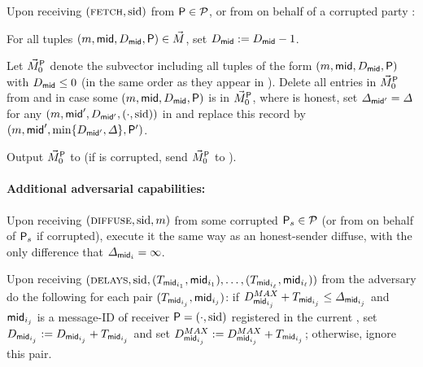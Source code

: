 \begin{cccFunctionality}
\begin{cccItemize}[nosep]
            \item Upon receiving $(\textsc{fetch}, \mathrm{sid})$ from $\mathsf{P} \in \mathcal{P}$, or from \adv on behalf of a corrupted party \party:
            \begin{cccEnum}[nosep]
                  \item For all tuples $(m, \mathsf{mid}, D_\mathsf{mid}, \mathsf{P}) \in \vec{M}$, set $D_\mathsf{mid} := D_\mathsf{mid} - 1$.
                  \item Let $\vec{M}^\mathsf{P}_0$ denote the subvector \vecM including all tuples of the form $(m, \mathsf{mid}, D_\mathsf{mid}, \mathsf{P})$ with $D_\mathsf{mid} \le 0$ (in the same order as they appear in \vecM).
                  Delete all entries in $\vec{M}^\mathsf{P}_0$ from \vecM and in case some $(m, \mathsf{mid}, D_\mathsf{mid}, \mathsf{P})$ is in
                  $\vec{M}^\mathsf{P}_0$, where \party is honest, set $\varDelta_{\mathsf{mid}'} = \varDelta$ for any $(m, \mathsf{mid}', D_{\mathsf{mid}'}, (\cdot, \mathrm{sid}))$ in \vecM and replace this record by $(m, \mathsf{mid}', \min \{ D_{\mathsf{mid}'}, \varDelta \}, \mathsf{P}')$.
                  \item Output $\vec{M}^\mathsf{P}_0$ to \party (if \party is corrupted, send $\vec{M}^\mathsf{P}_0$ to \adv).
            \end{cccEnum}
      \end{cccItemize}

      \paragraph{Additional adversarial capabilities:}
      \begin{cccItemize}[nosep]
            \item Upon receiving $(\textsc{diffuse}, \mathrm{sid}, m)$ from some corrupted $\mathsf{P}_s \in \mathcal{P}$ (or from \adv on behalf of $\mathsf{P}_s$ if corrupted), 
            execute it the same way as an honest-sender diffuse, with the only difference that $\varDelta_{\mathsf{mid}_i} = \infty$.

            \item Upon receiving $(\textsc{delays}, \mathrm{sid}, (T_{\mathsf{mid}_{i_1}}, \mathsf{mid}_{i_1}), \ldots, (T_{\mathsf{mid}_{i_\ell}}, \mathsf{mid}_{i_\ell}))$ from the adversary do the following for each pair $(T_{\mathsf{mid}_{i_j}}, \mathsf{mid}_{i_j})$:
            if $D^{MAX}_{\mathsf{mid}_{i_j}} + T_{\mathsf{mid}_{i_j}} \le \varDelta_{\mathsf{mid}_{i_j}}$ and $\mathsf{mid}_{i_j}$ is a message-ID of receiver $\mathsf{P} = (\cdot, \mathrm{sid})$ registered in the current \vecM, set $D_{\mathsf{mid}_{i_j}} := D_{\mathsf{mid}_{i_j}} + T_{\mathsf{mid}_{i_j}}$ and set $D^{MAX}_{\mathsf{mid}_{i_j}} := D^{MAX}_{\mathsf{mid}_{i_j}} + T_{\mathsf{mid}_{i_j}}$; otherwise, ignore this pair.


\end{cccItemize}
\end{cccFunctionality}
